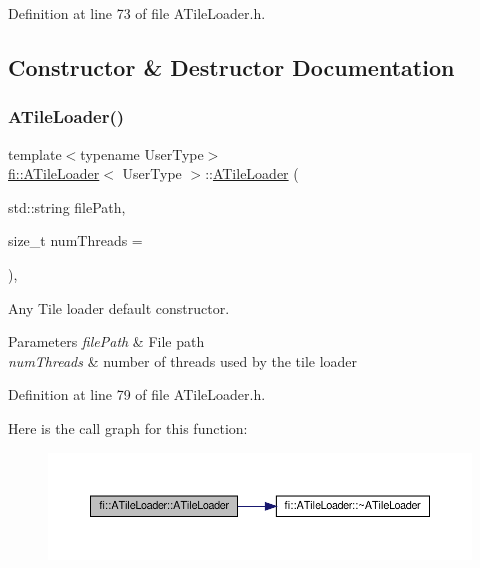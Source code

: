 Definition at line 73 of file A\+Tile\+Loader.\+h.



\subsection{Constructor \& Destructor Documentation}
\mbox{\label{classfi_1_1ATileLoader_a853a3209bab3a5e024f9d1ca7c8933f3}} 
\subsubsection{\texorpdfstring{A\+Tile\+Loader()}{ATileLoader()}}
{\footnotesize\ttfamily template$<$typename User\+Type$>$ \\
\hyperlink{classfi_1_1ATileLoader}{fi\+::\+A\+Tile\+Loader}$<$ User\+Type $>$\+::\hyperlink{classfi_1_1ATileLoader}{A\+Tile\+Loader} (\begin{DoxyParamCaption}\item[{std\+::string}]{file\+Path,  }\item[{size\+\_\+t}]{num\+Threads = {} }\end{DoxyParamCaption})\hspace{0.3cm}{\ttfamily [inline]}, {\ttfamily [explicit]}}



Any Tile loader default constructor. 


\begin{DoxyParams}{Parameters}
{\em file\+Path} & File path \\
\hline
{\em num\+Threads} & number of threads used by the tile loader \\
\hline
\end{DoxyParams}


Definition at line 79 of file A\+Tile\+Loader.\+h.

Here is the call graph for this function\+:
\nopagebreak
\begin{figure}[H]
\begin{center}
\leavevmode
\includegraphics[width=350pt]{dc/d54/classfi_1_1ATileLoader_a853a3209bab3a5e024f9d1ca7c8933f3_cgraph}
\end{center}
\end{figure}
\mbox{\label{classfi_1_1ATileLoader_ab04d8b3add3187cfa57a0f5323f8f7b4}} 
